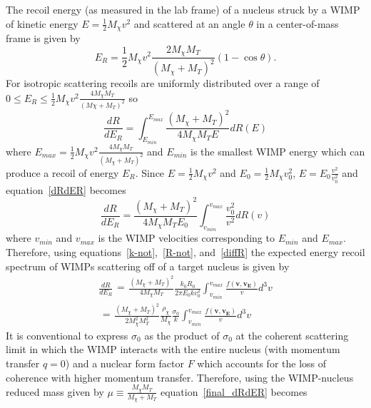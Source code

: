 The recoil energy (as measured in the lab frame) of a nucleus struck by a WIMP of kinetic energy $E=\frac{1}{2} M_\chi v^2$ and scattered at an angle $\theta$ in a center-of-mass frame is given by
\begin{equation}
E_R= \frac{1}{2} M_\chi v^2 \frac{2 M_\chi M_T}{(M_\chi + M_T)^2} (1-\cos\theta).
\end{equation}
For isotropic scattering recoils are uniformly distributed over a range of $0 \leq E_R \leq \frac{1}{2} M_\chi v^2 \frac{4 M_\chi M_T}{(M\chi + M_T)^2}$ so
\begin{equation} \label{dRdER}
\frac{dR}{dE_R} = \int_{E_{min}}^{E_{max}} \frac{(M_\chi + M_T)^2}{4 M_\chi M_T E} dR(E)
\end{equation}
where $E_{max} = \frac{1}{2} M_\chi v^2 \frac{4 M_\chi M_T}{(M_\chi + M_T)^2}$ and $E_{min}$ is the smallest WIMP energy which can produce a recoil of energy $E_R$.  Since $E=\frac{1}{2}M_\chi v^2$ and $E_0=\frac{1}{2}M_\chi v_0^2$, $E=E_0 \frac{v^2}{v_0^2}$ and equation~\ref{dRdER} becomes
\begin{equation}
\frac{dR}{dE_R} = \frac{(M_\chi + M_T)^2}{4 M_\chi M_T E_0} \int_{v_{min}}^{v_{max}} \frac{v_0^2}{v^2} dR(v)
\end{equation}
where $v_{min}$ and $v_{max}$ is the WIMP velocities corresponding to $E_{min}$ and $E_{max}$.
Therefore, using equations~\ref{k-not},~\ref{R-not}, and~\ref{diffR} the expected energy recoil spectrum of WIMPs scattering off of a target nucleus is given by
\begin{align} \label{final_dRdER}
\frac{dR}{dE_R} \begin{aligned} = \end{aligned} \frac{(M_\chi + M_T)^2}{4 M_\chi M_T} \frac{k_0 R_0}{2\pi E_0 k v_0^2}  \int_{v_{min}}^{v_{max}} \frac{f(\mathbf{v},\mathbf{v_E})}{v} d^3v \nonumber \\
\begin{aligned} = \end{aligned} \frac{ (M_\chi + M_T)^2}{2M_\chi^2M_T^2} \frac{\rho_\chi}{M_\chi} \frac{\sigma_0}{k} \int_{v_{min}}^{v_{max}} \frac{f(\mathbf{v},\mathbf{v_E})}{v} d^3v
\end{align}
It is conventional to express $\sigma_0$ as the product of $\sigma_0$ at the coherent scattering limit in which the WIMP interacts with the entire nucleus (with momentum transfer $q=0$) and a nuclear form factor $F$ which accounts for the loss of coherence with higher momentum transfer.  Therefore, using the WIMP-nucleus reduced mass given by $\mu\equiv \frac{M_\chi M_T}{M_\chi + M_T}$ equation~\ref{final_dRdER} becomes

